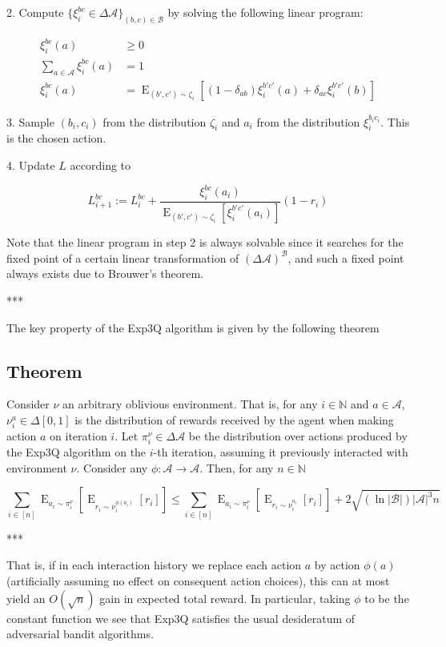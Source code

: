 \documentclass[a4paper]{article}
\DeclareMathOperator{\E}{E}
\newcommand{\Nats}{\mathbb{N}}
\newcommand{\Abs}[1]{\lvert #1 \rvert}
\newcommand{\Act}{\mathcal{A}}
\newcommand{\ActCh}{\mathcal{B}}
\begin{document}
2. Compute ${\{\xi_i^{bc} \in \Delta \Act\}_{(b,c) \in \ActCh}}$ by solving the following linear program:

\begin{align*}
\xi_i^{bc}(a) &\geq 0 \\
\sum_{a \in \Act} \xi_i^{bc}(a) &= 1 \\
\xi_i^{bc}(a) &= \E_{(b',c') \sim \zeta_i} [(1-\delta_{ab}) \xi_i^{b'c'}(a) + \delta_{ac} \xi_i^{b'c'}(b)]
\end{align*}

3. Sample ${(b_i,c_i)}$ from the distribution ${\zeta_i}$ and ${a_i}$ from the distribution ${\xi_i^{b_ic_i}}$. This is the chosen action.

4. Update ${L}$ according to

$$L_{i+1}^{bc}:=L_i^{bc} + \frac{\xi_i^{bc}(a_i)}{\E_{(b',c') \sim \zeta_i}[\xi_i^{b'c'}(a_i)]}(1-r_i)$$

Note that the linear program in step 2 is always solvable since it searches for the fixed point of a certain linear transformation of ${(\Delta \Act)^\ActCh}$, and such a fixed point always exists due to Brouwer's theorem.

***

The key property of the Exp3Q algorithm is given by the following theorem

\subsection{Theorem}

Consider ${\nu}$ an arbitrary oblivious environment. That is, for any ${i \in \Nats}$ and ${a \in \Act}$, ${\nu_i^a \in \Delta[0,1]}$ is the distribution of rewards received by the agent when making action ${a}$ on iteration ${i}$. Let ${\pi^\nu_i \in \Delta \Act}$ be the distribution over actions produced by the Exp3Q algorithm on the ${i}$-th iteration, assuming it previously interacted with environment ${\nu}$. Consider any ${\phi: \Act \rightarrow \Act}$. Then, for any ${n \in \Nats}$

$$\sum_{i \in [n]} \E_{a_i \sim \pi_i^\nu}[\E_{r_i \sim \nu_i^{\phi(a_i)}} [r_i]] \leq \sum_{i \in [n]} \E_{a_i \sim \pi_i^\nu}[\E_{r_i \sim \nu_i^{a_i}} [r_i]] + 2\sqrt{(\ln \Abs{\ActCh}) \Abs{\Act}^3 n}$$

***

That is, if in each interaction history we replace each action ${a}$ by action ${\phi(a)}$ (artificially assuming no effect on consequent action choices), this can at most yield an ${O(\sqrt{n})}$ gain in expected total reward. In particular, taking ${\phi}$ to be the constant function we see that Exp3Q satisfies the usual desideratum of adversarial bandit algorithms.
\end{document}
